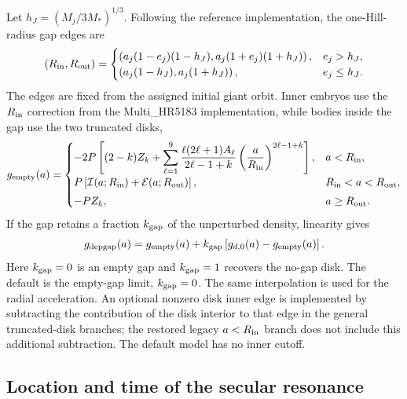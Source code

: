 Let $h_J=(M_j/3M_*)^{1/3}$. Following the reference implementation, the
one-Hill-radius gap edges are
\begin{equation}
    (R_{\rm in},R_{\rm out})=
    \begin{cases}
    \left(a_j(1-e_j)(1-h_J),a_j(1+e_j)(1+h_J)\right),&e_j>h_J,\\
    \left(a_j(1-h_J),a_j(1+h_J)\right),&e_j\leq h_J.
    \end{cases}
\label{eq:hill_gap_edges}
\end{equation}
The edges are fixed from the assigned initial giant orbit. Inner embryos use
the $R_{\rm in}$ correction from the Multi\_HR5183 implementation, while
bodies inside the gap use the two truncated disks,
\begin{equation}
g_{\rm empty}(a)=
\begin{cases}
-2P\left[(2-k)Z_k+\displaystyle\sum_{\ell=1}^{9}
\frac{\ell(2\ell+1)A_\ell}{2\ell-1+k}
\left(\frac{a}{R_{\rm in}}\right)^{2\ell-1+k}\right],
&a<R_{\rm in},\\[3pt]
 P\left[{\cal I}(a;R_{\rm in})
             +{\cal E}(a;R_{\rm out})\right],
&R_{\rm in}<a<R_{\rm out},\\[3pt]
-PZ_k,&a\geq R_{\rm out}.
\end{cases}
\label{eq:empty_gap_precession}
\end{equation}
If the gap retains a fraction $k_{\rm gap}$ of the unperturbed density,
linearity gives
\begin{equation}
    g_{\rm depgap}(a)=g_{\rm empty}(a)
    +k_{\rm gap}\left[g_{d,0}(a)-g_{\rm empty}(a)\right].
\label{eq:depleted_gap_precession}
\end{equation}
Here $k_{\rm gap}=0$ is an empty gap and $k_{\rm gap}=1$ recovers the
no-gap disk. The default is the empty-gap limit, $k_{\rm gap}=0$. The same
interpolation is used for the radial acceleration.
An optional nonzero disk inner edge is implemented by subtracting the
contribution of the disk interior to that edge in the general truncated-disk
branches; the restored legacy $a<R_{\rm in}$ branch does not include this
additional subtraction. The default model has no inner cutoff.

\subsection{Location and time of the secular resonance}

